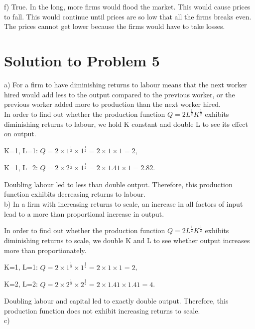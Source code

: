 \documentclass[12pt]{article}
\begin{document}
  f) True. In the long, more firms would flood the market. This would cause prices to fall. This would continue until prices are so low that all the firms breaks even. The prices cannot get lower because the firms would have to take losses. 
 
 
 \section*{Solution to Problem 5}
 a) For a firm to have diminishing returns to labour means that the next worker hired would add less to the output compared to the previous worker, or the previous worker added more to production than the next worker hired.\\
 
 In order to find out whether the production function $Q = 2L^{\frac{1}{2}}K^{\frac{1}{2}}$ exhibits diminishing returns to labour, we hold K constant and double L to see its effect on output.
 
 K=1, L=1: $Q = 2 \times 1^{\frac{1}{2}} \times 1^{\frac{1}{2}} = 2 \times 1 \times 1 = 2 $,
 
 K=1, L=2: $Q = 2 \times 2^{\frac{1}{2}} \times 1^{\frac{1}{2}} = 2 \times 1.41 \times 1 = 2.82 $.
 
 Doubling labour led to less than double output. Therefore, this production function exhibits decreasing returns to labour.\\
 
 b) In a firm with increasing returns to scale, an increase in all factors of input lead to a more than proportional increase in output. 
 
  In order to find out whether the production function $Q = 2L^{\frac{1}{2}}K^{\frac{1}{2}}$ exhibits diminishing returns to scale, we double K and L to see whether output increases more than proportionately.
  
  K=1, L=1: $Q = 2 \times 1^{\frac{1}{2}} \times 1^{\frac{1}{2}} = 2 \times 1 \times 1 = 2 $,
  
  K=2, L=2: $Q = 2 \times 2^{\frac{1}{2}} \times 2^{\frac{1}{2}} = 2 \times 1.41 \times 1.41 = 4 $.
  
  Doubling labour and capital led to exactly double output. Therefore, this production function does not exhibit increasing returns to scale.\\
  
  c) 
\end{document}

